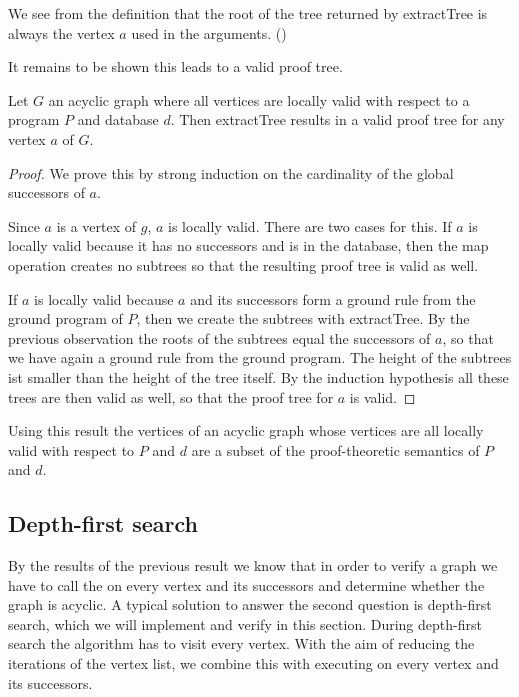 We see from the definition that the root of the tree returned by extractTree is always the vertex $a$ used in the arguments. (\rootOfExtractTree)

It remains to be shown this leads to a valid proof tree.

\begin{lemma}[\extractTreeValidIffAllLocallyValidAndAcyclic]
    Let $G$ an acyclic graph where all vertices are locally valid with respect to a program $P$ and database $d$. Then extractTree results in a valid proof tree for any vertex $a$ of $G$.
\end{lemma}
\begin{proof}
    We prove this by strong induction on the cardinality of the global successors of $a$.

    Since $a$ is a vertex of $g$, $a$ is locally valid. There are two cases for this. If $a$ is locally valid because it has no successors and is in the database, then the map operation creates no subtrees so that the resulting proof tree is valid as well.

    If $a$ is locally valid because $a$ and its successors form a ground rule from the ground program of $P$, then we create the subtrees with extractTree. By the previous observation the roots of the subtrees equal the successors of $a$, so that we have again a ground rule from the ground program. The height of the subtrees ist smaller than the height of the tree itself. By the induction hypothesis all these trees are then valid as well, so that the proof tree for $a$ is valid.
\end{proof}

Using this result the vertices of an acyclic graph whose vertices are all locally valid with respect to $P$ and $d$ are a subset of the proof-theoretic semantics of $P$ and $d$.

\subsection{Depth-first search}

By the results of the previous result we know that in order to verify a graph we have to call the \localValidityCheck on every vertex and its successors and determine whether the graph is acyclic. A typical solution to answer the second question is depth-first search, which we will implement and verify in this section. During depth-first search the algorithm has to visit every vertex. With the aim of reducing the iterations of the vertex list, we combine this with executing \localValidityCheck on every vertex and its successors.

